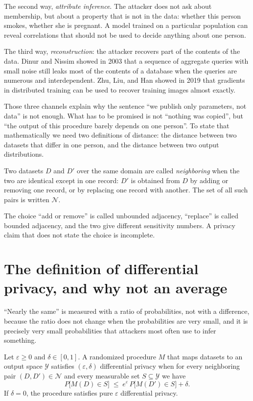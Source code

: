 The second way, \emph{attribute inference}. The attacker does not ask about membership,
but about a property that is not in the data: whether this person smokes, whether she is
pregnant. A model trained on a particular population can reveal correlations that should
not be used to decide anything about one person.

The third way, \emph{reconstruction}: the attacker recovers part of the contents of the
data. Dinur and Nissim showed in 2003 that a sequence of aggregate queries with small
noise still leaks most of the contents of a database when the queries are numerous and
interdependent. Zhu, Liu, and Han showed in 2019 that gradients in distributed training
can be used to recover training images almost exactly.

Those three channels explain why the sentence ``we publish only parameters, not data''
is not enough. What has to be promised is not ``nothing was copied'', but ``the output of
this procedure barely depends on one person''. To state that mathematically we need two
definitions of distance: the distance between two datasets that differ in one person,
and the distance between two output distributions.

\begin{definisi}
Two datasets $D$ and $D'$ over the same domain are called \emph{neighboring} when the
two are identical except in one record: $D'$ is obtained from $D$ by adding or removing
one record, or by replacing one record with another. The set of all such pairs is written
$\mathcal{N}$.
\end{definisi}

The choice ``add or remove'' is called unbounded adjacency, ``replace'' is called bounded
adjacency, and the two give different sensitivity numbers. A privacy claim that does not
state the choice is incomplete.

\section{The definition of differential privacy, and why not an average}

``Nearly the same'' is measured with a ratio of probabilities, not with a difference,
because the ratio does not change when the probabilities are very small, and it is
precisely very small probabilities that attackers most often use to infer something.

\begin{definisi}
Let $\varepsilon\ge 0$ and $\delta\in[0,1]$. A randomized procedure $M$ that maps
datasets to an output space $\mathcal{Y}$ satisfies $(\varepsilon,\delta)$ differential
privacy when for every neighboring pair $(D,D')\in\mathcal{N}$ and every measurable set
$S\subseteq\mathcal{Y}$ we have
\begin{equation}
P\bigl[M(D)\in S\bigr] \;\le\; e^{\varepsilon}\,P\bigl[M(D')\in S\bigr] + \delta .
\end{equation}
If $\delta=0$, the procedure satisfies pure $\varepsilon$ differential privacy.
\end{definisi}

